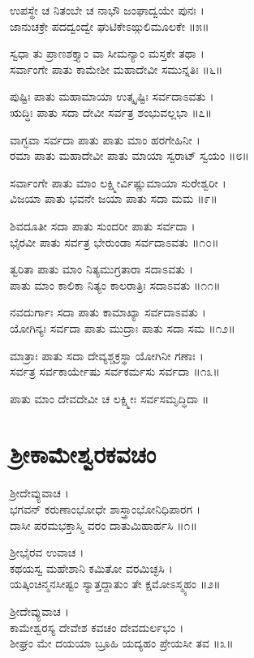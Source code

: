 ಉಪಸ್ಥೇ ಚ ನಿತಂಬೇ ಚ ನಾಭೌ ಜಂಘಾದ್ವಯೇ ಪುನಃ ।\\
ಜಾನುಚಕ್ರೇ ಪದದ್ವಂದ್ವೇ ಘುಟಿಕೇಽಙ್ಗುಲಿಮೂಲಕೇ ॥೫॥

ಸ್ವಧಾ ತು ಪ್ರಾಣಶಕ್ತ್ಯಾಂ ವಾ ಸೀಮನ್ಯಾಂ ಮಸ್ತಕೇ ತಥಾ ।\\
ಸರ್ವಾಂಗೇ ಪಾತು ಕಾಮೇಶೀ ಮಹಾದೇವೀ ಸಮುನ್ನತಿಃ ॥೬॥

ಪುಷ್ಟಿಃ ಪಾತು ಮಹಾಮಾಯಾ ಉತ್ಕೃಷ್ಟಿಃ ಸರ್ವದಾಽವತು ।\\
ಋದ್ಧಿಃ ಪಾತು ಸದಾ ದೇವೀ ಸರ್ವತ್ರ ಶಂಭುವಲ್ಲಭಾ ॥೭॥

ವಾಗ್ಭವಾ ಸರ್ವದಾ ಪಾತು ಪಾತು ಮಾಂ ಹರಗೇಹಿನೀ ।\\
ರಮಾ ಪಾತು ಮಹಾದೇವೀ ಪಾತು ಮಾಯಾ ಸ್ವರಾಟ್ ಸ್ವಯಂ ॥೮॥

ಸರ್ವಾಂಗೇ ಪಾತು ಮಾಂ ಲಕ್ಷ್ಮೀರ್ವಿಷ್ಣುಮಾಯಾ ಸುರೇಶ್ವರೀ ।\\
ವಿಜಯಾ ಪಾತು ಭವನೇ ಜಯಾ ಪಾತು ಸದಾ ಮಮ ॥೯॥

ಶಿವದೂತೀ ಸದಾ ಪಾತು ಸುಂದರೀ ಪಾತು ಸರ್ವದಾ ।\\
ಭೈರವೀ ಪಾತು ಸರ್ವತ್ರ ಭೇರುಂಡಾ ಸರ್ವದಾಽವತು ॥೧೦॥

ತ್ವರಿತಾ ಪಾತು ಮಾಂ ನಿತ್ಯಮುಗ್ರತಾರಾ ಸದಾಽವತು ।\\
ಪಾತು ಮಾಂ ಕಾಲಿಕಾ ನಿತ್ಯಂ ಕಾಲರಾತ್ರಿಃ ಸದಾಽವತು ॥೧೧॥

ನವದುರ್ಗಾಃ ಸದಾ ಪಾತು ಕಾಮಾಖ್ಯಾ ಸರ್ವದಾಽವತು ।\\
ಯೋಗಿನ್ಯಃ ಸರ್ವದಾ ಪಾತು ಮುದ್ರಾಃ ಪಾತು ಸದಾ ಸಮ ॥೧೨॥

ಮಾತ್ರಾಃ ಪಾತು ಸದಾ ದೇವ್ಯಶ್ಚಕ್ರಸ್ಥಾ ಯೋಗಿನೀ ಗಣಾಃ ।\\
ಸರ್ವತ್ರ ಸರ್ವಕಾರ್ಯೇಷು ಸರ್ವಕರ್ಮಸು ಸರ್ವದಾ ॥೧೩॥

ಪಾತು ಮಾಂ ದೇವದೇವೀ ಚ ಲಕ್ಷ್ಮೀಃ ಸರ್ವಸಮೃದ್ಧಿದಾ ॥


\section{ಶ್ರೀಕಾಮೇಶ್ವರಕವಚಂ}

ಶ್ರೀದೇವ್ಯುವಾಚ ।\\
ಭಗವನ್ ಕರುಣಾಂಭೋಧೇ ಶಾಸ್ತ್ರಾಂಭೋನಿಧಿಪಾರಗ ।\\
ದಾಸೀ ಪರಮಭಕ್ತಾಸ್ಮಿ ವರಂ ದಾತುಮಿಹಾರ್ಹಸಿ ॥೧॥

ಶ್ರೀಭೈರವ ಉವಾಚ ।\\
ಕಥಯಸ್ವ ಮಹೇಶಾನಿ ಕಮಿತೋ ವರಮಿಚ್ಛಸಿ ।\\
ಯತ್ಕಿಂಚಿನ್ಮನಸೀಷ್ಟಂ ಸ್ಯಾತ್ತದ್ದಾತುಂ ತೇ ಕ್ಷಮೋಽಸ್ಮ್ಯಹಂ ॥೨॥

ಶ್ರೀದೇವ್ಯುವಾಚ ।\\
ಕಾಮೇಶ್ವರಸ್ಯ ದೇವೇಶ ಕವಚಂ ದೇವದುರ್ಲಭಂ ।\\
ಶೀಘ್ರಂ ಮೇ ದಯಯಾ ಬ್ರೂಹಿ ಯದ್ಯಹಂ ಪ್ರೇಯಸೀ ತವ ॥೩॥

